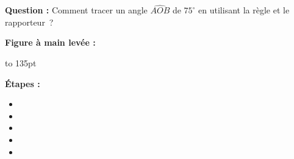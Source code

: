 \documentclass[activite]{thedocument}
\begin{document}
\noindent
{\bfseries Question :}\vskip10pt\noindent
Comment tracer un angle $\widehat{AOB}$ de $75^\circ$ en utilisant la règle
et le rapporteur~?\vskip20pt\noindent
\begin{minipage}[t]{.5\linewidth}
    {\centering\bfseries Figure à main levée :}
    \begin{mdframed}
        \vbox to 135pt{}
    \end{mdframed}
\end{minipage}%
\begin{minipage}[t]{.5\linewidth}
    {\centering\bfseries Étapes :\par}
    \begin{itemize}[label=$-$]
        \item\vskip10pt
        \item\vskip10pt
        \item\vskip10pt
        \item\vskip10pt
        \item\vskip10pt
    \end{itemize}
\end{minipage}
\vskip20pt
\end{document}
